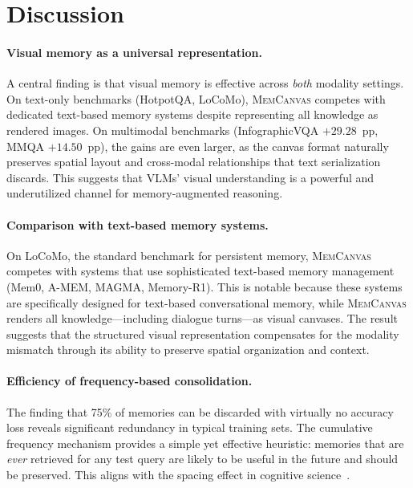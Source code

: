 \documentclass{article}
\newcommand{\memcanvas}{\textsc{MemCanvas}}
\begin{document}
\section{Discussion}
\label{sec:discussion}

\paragraph{Visual memory as a universal representation.}
A central finding is that visual memory is effective across \emph{both} modality settings. On text-only benchmarks (HotpotQA, LoCoMo), \memcanvas{} competes with dedicated text-based memory systems despite representing all knowledge as rendered images. On multimodal benchmarks (InfographicVQA $+29.28$~pp, MMQA $+14.50$~pp), the gains are even larger, as the canvas format naturally preserves spatial layout and cross-modal relationships that text serialization discards. This suggests that VLMs' visual understanding is a powerful and underutilized channel for memory-augmented reasoning.

\paragraph{Comparison with text-based memory systems.}
On LoCoMo, the standard benchmark for persistent memory, \memcanvas{} competes with systems that use sophisticated text-based memory management (Mem0, A-MEM, MAGMA, Memory-R1). This is notable because these systems are specifically designed for text-based conversational memory, while \memcanvas{} renders all knowledge---including dialogue turns---as visual canvases. The result suggests that the structured visual representation compensates for the modality mismatch through its ability to preserve spatial organization and context.

\paragraph{Efficiency of frequency-based consolidation.}
The finding that 75\% of memories can be discarded with virtually no accuracy loss reveals significant redundancy in typical training sets. The cumulative frequency mechanism provides a simple yet effective heuristic: memories that are \emph{ever} retrieved for any test query are likely to be useful in the future and should be preserved. This aligns with the spacing effect in cognitive science~\citep{ebbinghaus1885memory}.
\end{document}
